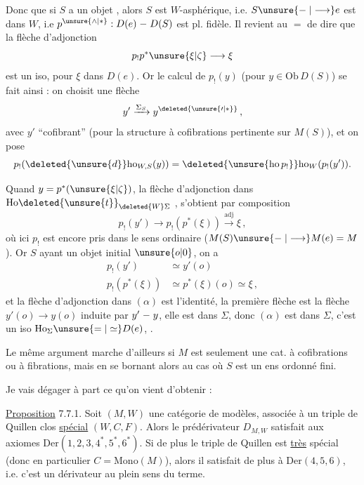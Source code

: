 Donc \uline{} que  si $S$ a un objet , alors $S$ est $W$-asphérique, i.e.  $S\unsure{\relbar|\longrightarrow}e$ est dans $W$, i.e $p^{\unsure{\wedge|*}}:D(e)\relbar D(S)$ est pl. fidèle.
Il revient au \ensuremath{=} de dire que la flèche d'adjonction
\[
p_!p^*\unsure{\xi|\zeta}\longrightarrow\xi
\]
est un iso, pour  $\xi$ dans $D(e)$. Or le calcul de $p_!(y)$ (pour $y\in\mathrm{Ob}\,D(S)$)\unsure{,} se fait ainsi : on choisit une flèche
\[
y'\xrightarrow{\Sigma_S}y^{\deleted{\unsure{\prime|*}}}\,,
\]
avec $y'$ ``cofibrant'' (pour la structure à cofibrations pertinente sur $M(S)$), et on
pose
\[
p_!(\deleted{\unsure{d}}\mathrm{ho}_{W,S}(y))=
\deleted{\unsure{\mathrm{ho}\,p_!}}\mathrm{ho}_W(p_!(y')) .
\]

Quand $y=p^*(\unsure{\xi|\zeta})$, la flèche d'adjonction  dans $\mathrm{Ho}\deleted{\unsure{t}}_{\deleted{W}\Sigma}$ , s'obtient par composition
\begingroup
\makeatletter
\tagsleft@true
\makeatother
\[
p_!(y')\longrightarrow p_!(p^*(\xi))\xrightarrow{\mathrm{adj}}\xi\,,
\tag*{$(\alpha)$}
\]
\endgroup
où ici $p_!$ est encore pris dans le sens ordinaire ($M(S)\unsure{\relbar|\longrightarrow}M(e)=M$). Or $S$ ayant un objet initial $\unsure{o|0}$, on a
\[
\begin{aligned}
p_!(y')&\simeq y'(o)\\
p_!(p^*(\xi))&\simeq p^*(\xi)(o)\simeq\xi\,,
\end{aligned}
\]
et la flèche d'adjonction dans $(\alpha)$ est l'identité, la  première flèche est la flèche $y'(o)\longrightarrow y(o)$ induite par $y'\relbar y$, elle est dans $\Sigma$, donc $(\alpha)$ est dans $\Sigma$,   c'est un iso  $\mathrm{Ho}_{\Sigma}\unsure{=|\simeq}D(e)$, .

Le même argument marche d'ailleurs si $M$ est seulement une cat. à cofibrations ou à fibrations, mais en se bornant alors au cas où $S$ est un ens ordonné fini.

Je vais dégager à part ce qu'on vient d'obtenir :

\uline{Proposition} 7.7.1. Soit $(M,W)$ une catégorie de modèles, associée à un triple de Quillen clos \uline{spécial} $(W,C,F)$. Alors le prédérivateur  $D_{M,W}$  satisfait aux axiomes $\mathrm{Der}(1,2,3,4^*,5^*,6^*)$. Si de plus le triple de Quillen est \uline{très} spécial (donc en particulier $C=\mathrm{Mono}(M)$), alors il satisfait de plus à $\mathrm{Der}(4,5,6)$, i.e. c'est un dérivateur au plein sens du terme.

